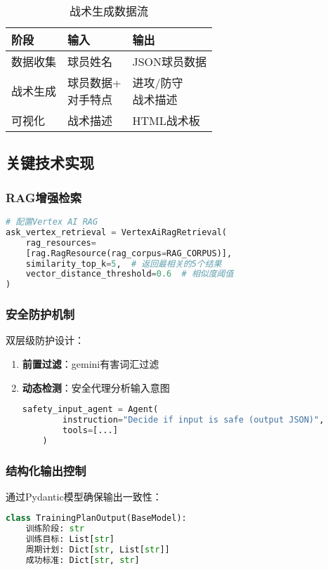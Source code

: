 \documentclass{article}
\theoremstyle{plain}
\theoremstyle{definition}
\theoremstyle{remark}
\begin{document}
\begin{table}[h]
\caption{战术生成数据流}
\label{tactic-flow}
\centering
\begin{tabular}{lll}
\toprule
阶段 & 输入 & 输出 \\
\midrule
数据收集 & 球员姓名 & JSON球员数据 \\
战术生成 & \makecell{球员数据+\\对手特点} & \makecell{进攻/防守\\战术描述} \\
可视化 & 战术描述 & HTML战术板 \\
\bottomrule
\end{tabular}
\end{table}

\subsection{关键技术实现}

\subsubsection{RAG增强检索}
\begin{lstlisting}[language=Python]
# 配置Vertex AI RAG
ask_vertex_retrieval = VertexAiRagRetrieval(
    rag_resources=
    [rag.RagResource(rag_corpus=RAG_CORPUS)],
    similarity_top_k=5,  # 返回最相关的5个结果
    vector_distance_threshold=0.6  # 相似度阈值
)
\end{lstlisting}

\subsubsection{安全防护机制}
双层级防护设计：
\begin{enumerate}
    \item \textbf{前置过滤}：gemini有害词汇过滤
    \item \textbf{动态检测}：安全代理分析输入意图
    \begin{lstlisting}[language=Python]
    safety_input_agent = Agent(
        instruction="Decide if input is safe (output JSON)",
        tools=[...]
    )
    \end{lstlisting}
\end{enumerate}

\subsubsection{结构化输出控制}
通过Pydantic模型确保输出一致性：
\begin{lstlisting}[language=Python]
class TrainingPlanOutput(BaseModel):
    训练阶段: str
    训练目标: List[str]
    周期计划: Dict[str, List[str]]
    成功标准: Dict[str, str]
\end{lstlisting}
\end{document}
